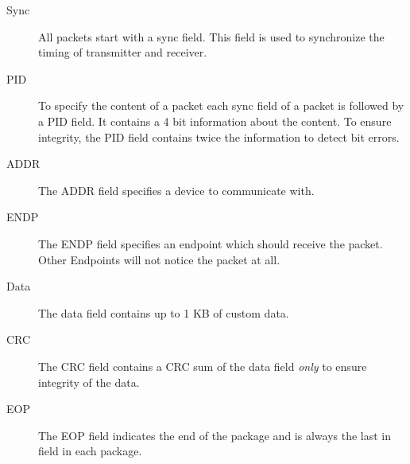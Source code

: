 \documentclass{acm_proc_article-sp}
\begin{document}
\begin{description}
\item[Sync]
All packets start with a sync field.
This field is used to synchronize the timing of transmitter and receiver. \cite{usb}\cite{beyond}

\item[PID]
To specify the content of a packet each sync field of a packet is followed by a PID field.
It contains a 4 bit information about the content.
To ensure integrity, the PID field contains twice the information to detect bit errors.

\item[ADDR]
The ADDR field specifies a device to communicate with. \cite{usb}\cite{beyond}

\item[ENDP]
The ENDP field specifies an endpoint which should receive the packet.
Other Endpoints will not notice the packet at all. \cite{usb}\cite{beyond}

\item[Data]
The data field contains up to 1 KB of custom data. \cite{usb}\cite{beyond}

\item [CRC]
The CRC field contains a CRC sum of the data field \emph{only} to ensure integrity of the data. \cite{usb}\cite{beyond}

\item[EOP]
The EOP field indicates the end of the package and is always the last in field in each package. \cite{usb}\cite{beyond}

\end{description}
\end{document}
